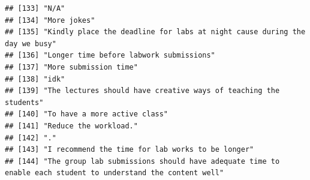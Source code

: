 \documentclass[
]{article}
\begin{document}
\begin{verbatim}
## [133] "N/A"                                                                                                                                                                                                                   
## [134] "More jokes"                                                                                                                                                                                                            
## [135] "Kindly place the deadline for labs at night cause during the day we busy"                                                                                                                                              
## [136] "Longer time before labwork submissions"                                                                                                                                                                                
## [137] "More submission time"                                                                                                                                                                                                  
## [138] "idk"                                                                                                                                                                                                                   
## [139] "The lectures should have creative ways of teaching the students"                                                                                                                                                       
## [140] "To have a more active class"                                                                                                                                                                                           
## [141] "Reduce the workload."                                                                                                                                                                                                  
## [142] "."                                                                                                                                                                                                                     
## [143] "I recommend the time for lab works to be longer"                                                                                                                                                                       
## [144] "The group lab submissions should have adequate time to enable each student to understand the content well"                                                                                                             

\end{verbatim}
\end{document}
